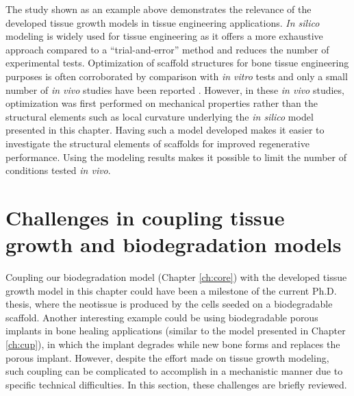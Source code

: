 The study shown as an example above \cite{Hede2021} demonstrates the relevance of the developed tissue growth models in tissue engineering applications. \textit{In silico} modeling is widely used for tissue engineering as it offers a more exhaustive approach compared to a ``trial-and-error'' method and reduces the number of experimental tests. Optimization of scaffold structures for bone tissue engineering purposes is often corroborated by comparison with \textit{in vitro} tests \cite{Alias2017,Rubert2021} and only a small number of \textit{in vivo} studies have been reported \cite{Long2012,Luo2017,Luo2015}. However, in these \textit{in vivo} studies, optimization was first performed on mechanical properties rather than the structural elements such as local curvature underlying the \textit{in silico} model presented in this chapter. Having such a model developed makes it easier to investigate the structural elements of scaffolds for improved regenerative performance. Using the modeling results makes it possible to limit the number of conditions tested \textit{in vivo}.

\section{Challenges in coupling tissue growth and biodegradation models} \label{sec:tissue_challenges}

Coupling our biodegradation model \cite{Barzegari2021} (Chapter \ref{ch:core}) with the developed tissue growth model in this chapter could have been a milestone of the current Ph.D. thesis, where the neotissue is produced by the cells seeded on a biodegradable scaffold. Another interesting example could be using biodegradable porous implants in bone healing applications (similar to the model presented in Chapter \ref{ch:cup}), in which the implant degrades while new bone forms and replaces the porous implant. However, despite the effort made on tissue growth modeling, such coupling can be complicated to accomplish in a mechanistic manner due to specific technical difficulties. In this section, these challenges are briefly reviewed.

